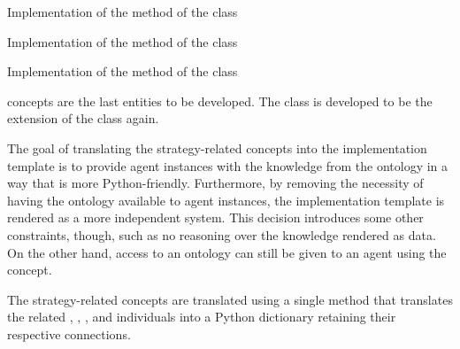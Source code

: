 \begin{listing}
    \caption{Implementation of the  method of the  class}
    \label{lst: mago-ag behaviour determine_behaviour_type}
\end{listing}

\begin{listing}
    \caption{Implementation of the  method of the  class}
    \label{lst: mago-ag behaviour get_fsm_states}
\end{listing}

\begin{listing}
    \caption{Implementation of the  method of the  class}
    \label{lst: mago-ag behaviour render_fsm_implementation}
\end{listing}



%
concepts are the last entities to be developed. The  class is developed to be the extension of the  class again.

The goal of translating the strategy-related concepts into the implementation template is to provide agent instances with the knowledge from the ontology in a way that is more Python-friendly. Furthermore, by removing the necessity of having the ontology available to agent instances, the implementation template is rendered as a more independent system. This decision introduces some other constraints, though, such as no reasoning over the knowledge rendered as data. On the other hand, access to an ontology can still be given to an agent using the  concept.

The strategy-related concepts are translated
%
using a single method that translates the related , , , and  individuals into a Python dictionary
%
retaining their respective connections.

